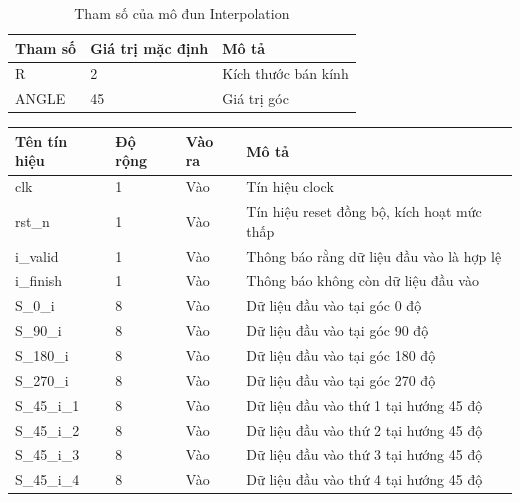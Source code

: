 \begin{table}[!ht]
    \centering
    \renewcommand{\arraystretch}{1.3} %
    \begin{tabular}{|p{3cm} p{4cm} p{8cm}|}
        \hline
        \rowcolor{gray!30}
        \textbf{Tham số } & \textbf{Giá trị mặc định}  & \textbf{Mô tả} \\
        \hline
        R & 2 & Kích thước bán kính 
        \\ \hline
        ANGLE & 45 & Giá trị góc
        \\
        \hline
    \end{tabular}
    \caption{Tham số của mô đun Interpolation}
    \label{tab:paramListInterpolation}
\end{table}
\begin{table}[H]
    \centering
    \renewcommand{\arraystretch}{1.2}
    \begin{tabular}{|p{3cm} p{2cm} p{2cm} p{8cm}|}
        \hline
        \rowcolor{gray!30}
        \textbf{Tên tín hiệu} & \textbf{Độ rộng} & \textbf{Vào ra} & \textbf{Mô tả} \\
        \hline
        clk & 1 & Vào & Tín hiệu clock \\
        \hline
        rst\_n & 1 & Vào & Tín hiệu reset đồng bộ, kích hoạt mức thấp \\
        \hline 
        i\_valid & 1 & Vào & Thông báo rằng dữ liệu đầu vào là hợp lệ \\
        \hline
        i\_finish & 1 & Vào & Thông báo không còn dữ liệu đầu vào \\
        \hline
        S\_0\_i & 8 & Vào & Dữ liệu đầu vào tại góc 0 độ \\
        \hline
        S\_90\_i & 8 & Vào & Dữ liệu đầu vào tại góc 90 độ \\
        \hline
        S\_180\_i & 8 & Vào & Dữ liệu đầu vào tại góc 180 độ \\
        \hline
        S\_270\_i & 8 & Vào & Dữ liệu đầu vào tại góc 270 độ \\
        \hline
        S\_45\_i\_1 & 8 & Vào & Dữ liệu đầu vào thứ 1 tại hướng 45 độ \\
        \hline
        S\_45\_i\_2 & 8 & Vào & Dữ liệu đầu vào thứ 2 tại hướng 45 độ \\
        \hline
        S\_45\_i\_3 & 8 & Vào & Dữ liệu đầu vào thứ 3 tại hướng 45 độ \\
        \hline
        S\_45\_i\_4 & 8 & Vào & Dữ liệu đầu vào thứ 4 tại hướng 45 độ \\

\end{tabular}
\end{table}
